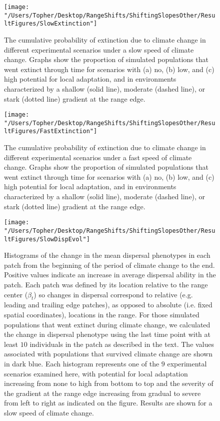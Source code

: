 \documentclass[12pt, oneside]{article}
\begin{document}
\begin{figure}
\centering
\texttt{[image: "/Users/Topher/Desktop/RangeShifts/ShiftingSlopesOther/ResultFigures/SlowExtinction"]}
\vspace{-5mm}
\caption[LoF entry]{The cumulative probability of extinction due to climate change in different experimental scenarios under a slow speed of climate change. Graphs show the proportion of simulated populations that went extinct through time for scenarios with (a) no, (b) low, and (c) high potential for local adaptation, and in environments characterized by a shallow (solid line), moderate (dashed line), or stark (dotted line) gradient at the range edge.}
\label{fig:ExtProbSlow}
\end{figure}

\begin{figure}
\centering
\texttt{[image: "/Users/Topher/Desktop/RangeShifts/ShiftingSlopesOther/ResultFigures/FastExtinction"]}
\vspace{-5mm}
\caption[LoF entry]{The cumulative probability of extinction due to climate change in different experimental scenarios under a fast speed of climate change. Graphs show the proportion of simulated populations that went extinct through time for scenarios with (a) no, (b) low, and (c) high potential for local adaptation, and in environments characterized by a shallow (solid line), moderate (dashed line), or stark (dotted line) gradient at the range edge.}
\label{fig:ExtProbFast}
\end{figure}

\begin{figure}
\centering
\texttt{[image: "/Users/Topher/Desktop/RangeShifts/ShiftingSlopesOther/ResultFigures/SlowDispEvol"]}
\vspace{-5mm}
\caption[LoF entry]{Histograms of the change in the mean dispersal phenotypes in each patch from the beginning of the period of climate change to the end. Positive values indicate an increase in average dispersal ability in the patch. Each patch was defined by its location relative to the range center ($\beta_{t}$) so changes in dispersal correspond to relative (e.g. leading and trailing edge patches), as opposed to absolute (i.e. fixed spatial coordinates), locations in the range.  For those simulated populations that went extinct during climate change, we calculated the change in dispersal phenotype using the last time point with at least $10$ individuals in the patch as described in the text. The values associated with populations that survived climate change are shown in dark blue. Each histogram represents one of the $9$ experimental scenarios examined here, with potential for local adaptation increasing from none to high from bottom to top and the severity of the gradient at the range edge increasing from gradual to severe from left to right as indicated on the figure. Results are shown for a slow speed of climate change.}
\label{fig:DispEvolSlow}
\end{figure}
\end{document}

